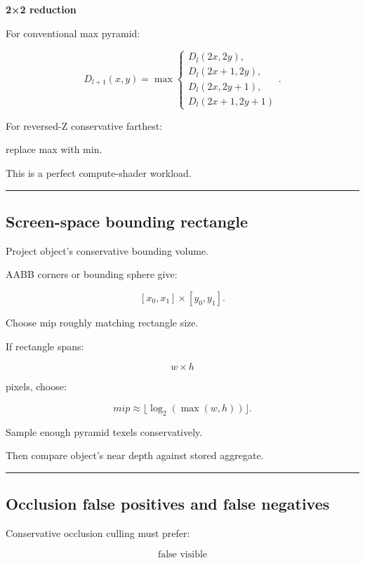 \textbf{2×2 reduction}

For conventional max pyramid:

\[
D_{l+1}(x,y)
=
\max
\begin{cases}
D_l(2x,2y),\\
D_l(2x+1,2y),\\
D_l(2x,2y+1),\\
D_l(2x+1,2y+1)
\end{cases}.
\]

For reversed-Z conservative farthest:

replace max with min.

This is a perfect compute-shader workload.

\begin{center}\rule{0.5\linewidth}{0.5pt}\end{center}

\subsection{Screen-space bounding rectangle}\label{04-visual-computing-ii-ch040-screen-space-bounding-rectangle}

Project object's conservative bounding volume.

AABB corners or bounding sphere give:

\[
[x_0,x_1]
\times
[y_0,y_1].
\]

Choose mip roughly matching rectangle size.

If rectangle spans:

\[
w\times h
\]

pixels, choose:

\[
mip\approx
\lfloor\log_2(\max(w,h))\rfloor.
\]

Sample enough pyramid texels conservatively.

Then compare object's near depth against stored aggregate.

\begin{center}\rule{0.5\linewidth}{0.5pt}\end{center}

\subsection{Occlusion false positives and false negatives}\label{04-visual-computing-ii-ch040-occlusion-false-positives-and-false-negatives}

Conservative occlusion culling must prefer:

\[
\boxed{
\text{false visible}
}
\]

